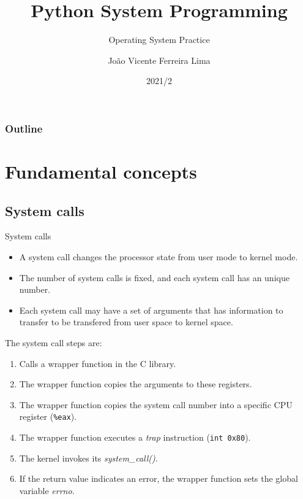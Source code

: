 \documentclass[xcolor=dvipsnames, 10pt, presentation,aspectratio=169]{beamer}
\author{João Vicente Ferreira Lima}
\date{2021/2}
\title{Python System Programming}
\subtitle{Operating System Practice}
\institute[UFSM]{Universidade Federal de Santa Maria \\ \url{jvlima@inf.ufsm.br} \\ \url{http://www.inf.ufsm.br/~jvlima}}
\begin{document}
\maketitle
{}
{
  \frametitle{Outline}
  \tableofcontents
}

\makeatletter
{}
\makeatother

\section{Fundamental concepts}
\label{sec:org251f05c}
\subsection{System calls}
\label{sec:org1b09d13}
\begin{frame}[label={sec:orge6fe0d0},fragile]{System calls}
 \begin{itemize}
\item A system call changes the processor state from user mode to kernel mode.
\item The number of system calls is fixed, and each system call has an
unique number.
\item Each system call may have a set of arguments that has information to
transfer to be transfered from user space to kernel space.
\end{itemize}

The system call steps are:
\begin{enumerate}
\item Calls a wrapper function in the C library.
\item The wrapper function copies the arguments to these registers.
\item The wrapper function copies the system call number into a specific
CPU register (\texttt{\%eax}).
\item The wrapper function executes a \emph{trap} instruction (\texttt{int 0x80}).
\item The kernel invokes its \emph{system\_call()}.
\item If the return value indicates an error, the wrapper function sets
the global variable \emph{errno}.
\end{enumerate}
\end{frame}
\end{document}
